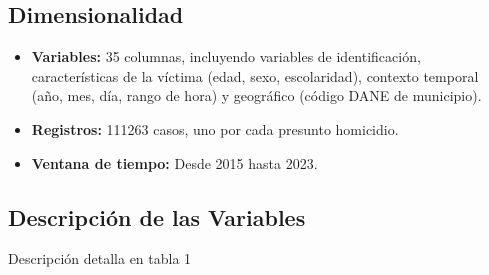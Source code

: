 \documentclass[lettersize,journal]{IEEEtran}
\begin{document}
\subsection{Dimensionalidad}
\begin{itemize}
    \item \textbf{Variables:} 35 columnas, incluyendo variables de identificación, características de la víctima (edad, sexo, escolaridad), contexto temporal (año, mes, día, rango de hora) y geográfico (código DANE de municipio).
    \item \textbf{Registros:} 111263 casos, uno por cada presunto homicidio.
    \item \textbf{Ventana de tiempo:} Desde 2015 hasta 2023.
\end{itemize}

\subsection{Descripción de las Variables}

Descripción detalla en tabla 1
\end{document}
